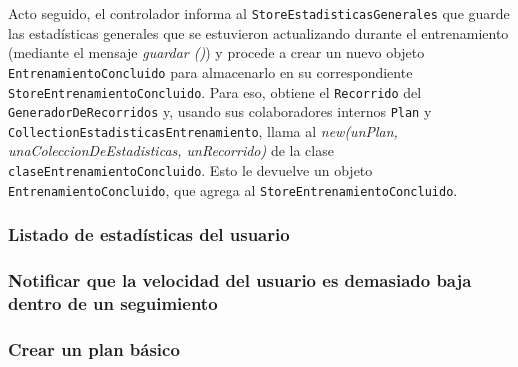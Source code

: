 Acto seguido, el controlador informa al \texttt{StoreEstadisticasGenerales} que guarde las estadísticas generales que se estuvieron actualizando durante el entrenamiento (mediante el mensaje \emph{guardar ()}) y procede a crear un nuevo objeto \texttt{EntrenamientoConcluido} para almacenarlo en su correspondiente \texttt{StoreEntrenamientoConcluido}. Para eso, obtiene el \texttt{Recorrido} del \texttt{GeneradorDeRecorridos} y, usando sus colaboradores internos \texttt{Plan} y \texttt{CollectionEstadisticasEntrenamiento}, llama al \emph{new(unPlan, unaColeccionDeEstadisticas, unRecorrido)} de la clase \texttt{claseEntrenamientoConcluido}. Esto le devuelve un objeto \texttt{EntrenamientoConcluido}, que agrega al \texttt{StoreEntrenamientoConcluido}.

\subsubsection{Listado de estadísticas del usuario}
\subsubsection{Notificar que la velocidad del usuario es demasiado baja dentro de un seguimiento}
\subsubsection{Crear un plan básico}
